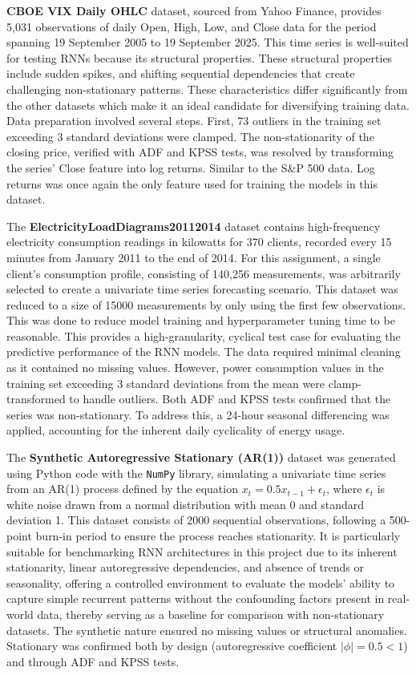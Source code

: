 \documentclass[conference, 10pt]{IEEEtran}
\begin{document}
\textbf{CBOE VIX Daily OHLC} dataset, sourced from Yahoo Finance, provides 5,031 observations of daily Open, High, Low,
and Close data for the period spanning 19 September 2005 to 19 September 2025. This time series is well-suited for
testing RNNs because its structural properties. These structural properties include sudden spikes, and shifting
sequential dependencies that create challenging non-stationary patterns. These characteristics differ significantly from
the other datasets which make it an ideal candidate for diversifying training data. Data preparation involved several
steps. First, 73 outliers in the training set exceeding 3 standard deviations were clamped. The non-stationarity of the
closing price, verified with ADF and KPSS tests, was resolved by transforming the series' Close feature into log
returns. Similar to the S\&P 500 data. Log returns was once again the only feature used for training the models in this
dataset.

The \textbf{ElectricityLoadDiagrams20112014} dataset contains high-frequency electricity consumption readings in
kilowatts for 370 clients, recorded every 15 minutes from January 2011 to the end of 2014. For this assignment, a single
client's consumption profile, consisting of 140,256 measurements, was arbitrarily selected to create a univariate time
series forecasting scenario. This dataset was reduced to a size of 15000 measurements by only using the first few
observations. This was done to reduce model training and hyperparameter tuning time to be reasonable. This provides a
high-granularity, cyclical test case for evaluating the predictive performance of the RNN models. The data required
minimal cleaning as it contained no missing values. However, power consumption values in the training set exceeding 3
standard deviations from the mean were clamp-transformed to handle outliers. Both ADF and KPSS tests confirmed that the
series was non-stationary. To address this, a 24-hour seasonal differencing was applied, accounting for the inherent
daily cyclicality of energy usage.

The \textbf{Synthetic Autoregressive Stationary (AR(1))} dataset was generated using Python code with the \texttt{NumPy}
library, simulating a univariate time series from an AR(1) process defined by the equation $x_t = 0.5 x_{t-1} +
\epsilon_t$, where $\epsilon_t$ is white noise drawn from a normal distribution with mean 0 and standard deviation 1.
This dataset consists of 2000 sequential observations, following a 500-point burn-in period to ensure the process reaches
stationarity. It is particularly suitable for benchmarking RNN architectures in this project due to its inherent
stationarity, linear autoregressive dependencies, and absence of trends or seasonality, offering a controlled
environment to evaluate the models' ability to capture simple recurrent patterns without the confounding factors present
in real-world data, thereby serving as a baseline for comparison with non-stationary datasets. The synthetic nature
ensured no missing values or structural anomalies. Stationary was confirmed both by design (autoregressive coefficient
$|\phi| = 0.5 < 1$) and through ADF and KPSS tests.
\end{document}
